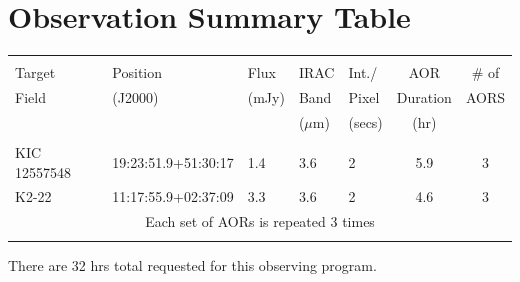 \documentclass[letterpaper,12pt]{article}
\begin{document}
\section{Observation Summary Table}\label{sec:ObsSumm}




\bigskip
\begin{tabular}{lllllcc}
\hline \\ 
Target & Position & Flux     & IRAC  & Int./ & AOR & \# of \\
Field & (J2000)   & (mJy) & Band & Pixel & Duration & AORS \\
& &  & ($\mu$m) & (secs) & (hr) & \\
\hline \\ 
KIC 12557548 & 19:23:51.9+51:30:17 & 1.4 & 3.6 & 2 & 5.9 & 3 \\
K2-22 & 11:17:55.9+02:37:09 & 3.3 & 3.6 & 2 & 4.6 & 3 \\
\multicolumn{7}{c}{Each set of AORs is repeated 3 times} \\
\hline \\
\end{tabular}


There are 32 hrs total requested for this observing program.\newline

\end{document}
